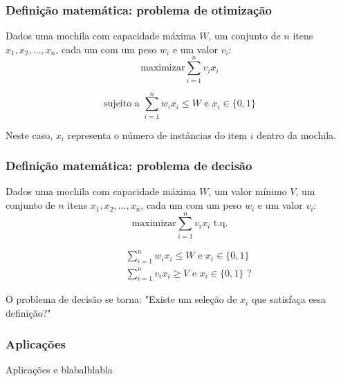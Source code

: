 \documentclass{beamer}
\begin{document}
\begin{frame}
\frametitle{Definição matemática: problema de otimização}

    Dados uma mochila com capacidade máxima $W$, um conjunto de $n$ itens $x_{1}, x_{2}, ..., x_{n}$,
    cada um com um peso $w_{i}$ e um valor $v_{i}$:\\

    \begin{equation*}
        \text{maximizar} \sum_{i=1}^{n} v_{i} x_{i}
    \end{equation*}

    \begin{equation*}
        \mbox{sujeito a } \sum_{i=1}^{n} w_{i} x_{i} \leq W \mbox{ e } x_{i} \in \{0,1\}
    \end{equation*}

    Neste caso, $x_{i}$ representa o número de instâncias do item $i$ dentro da mochila.

\end{frame}

\begin{frame}
    \frametitle{Definição matemática: problema de decisão}

    Dados uma mochila com capacidade máxima $W$, um valor mínimo $V$, um conjunto de $n$ itens $x_{1}, x_{2}, ..., x_{n}$,
    cada um com um peso $w_{i}$ e um valor $v_{i}$:\\

    \begin{equation*}
        \text{maximizar} \sum_{i=1}^{n} v_{i} x_{i} \text{ t.q.}
    \end{equation*}

    \begin{equation*}
        \begin{split}
            &\quad \sum_{i=1}^{n} w_{i} x_{i} \leq W \mbox{ e } x_{i} \in \{0,1\} \\
            &\quad \sum_{i=1}^{n} v_{i} x_{i} \geq V \mbox{ e } x_{i} \in \{0,1\} \text{ ?}
        \end{split}
    \end{equation*}

    O problema de decisão se torna: "Existe um seleção de $x_{i}$ que satisfaça essa definição?"

\end{frame}

\begin{frame}
\frametitle{Aplicações}

Aplicações e blabalblabla

\end{frame}
\end{document}
